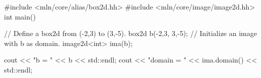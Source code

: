 #include <mln/core/alias/box2d.hh>
#include <mln/core/image/image2d.hh>
int main()
{
  // Define a box2d from (-2,3) to (3,-5).
  box2d b(-2,3, 3,-5);
  // Initialize an image with b as domain.
  image2d<int> ima(b);

  cout << "b = " << b << std::endl;
  cout << "domain = " << ima.domain() << std::endl;
}
